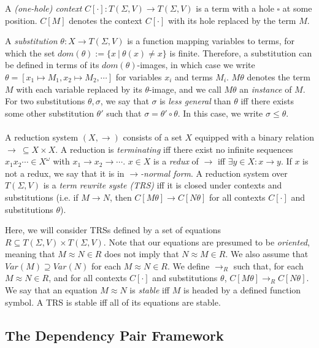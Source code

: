 \documentclass{article}
\begin{document}
A \emph{(one-hole) context} $C[\cdot] : T(\Sigma, V) \rightarrow T(\Sigma, V)$ is a term with a hole $\square$ at some position. $C[M]$ denotes the context $C[\cdot]$ with its hole replaced by the term $M$. 

A \emph{substitution} $\theta : X \rightarrow T(\Sigma, V)$ is a function mapping variables to terms, for which the set $dom(\theta) := \{ x ~|~ \theta(x) \neq x\}$ is finite. Therefore, a substitution can be defined in terms of its $dom(\theta)$-images, in which case we write $\theta = [x_1 \mapsto M_1, x_2 \mapsto M_2, \cdots]$ for variables $x_i$ and terms $M_i$. $M \theta$ denotes the term $M$ with each variable replaced by its $\theta$-image, and we call $M\theta$ an \emph{instance} of $M$. For two substitutions $\theta, \sigma$, we say that $\sigma$ is \emph{less general} than $\theta$ iff there exists some other substitution $\theta'$ such that $\sigma = \theta' \circ \theta$. In this case, we write $\sigma \leq \theta$. 
\\~\\
A reduction system $(X, \rightarrow)$ consists of a set $X$ equipped with a binary relation $\rightarrow ~\subseteq X \times X$. A reduction is \emph{terminating} iff there exist no infinite sequences $x_1x_2 \cdots \in X^\omega$ with $x_1 \rightarrow x_2 \rightarrow \cdots$. $x \in X$ is a \emph{redux} of $\rightarrow$ iff $\exists y \in X : x \rightarrow y$. If $x$ is not a redux, we say that it is in \emph{$\rightarrow$-normal form}. A reduction system over $T(\Sigma, V)$ is a \emph{term rewrite syste (TRS)} iff it is closed under contexts and substitutions (i.e. if $M \rightarrow N$, then $C[M\theta] \rightarrow C[N\theta]$ for all contexts $C[\cdot]$ and substitutions $\theta$). 

Here, we will consider TRSs defined by a set of equations $R \subseteq T(\Sigma, V) \times T(\Sigma, V)$. Note that our equations are presumed to be \emph{oriented}, meaning that $M \approx N \in R$ does not imply that $N \approx M \in R$. We also assume that $Var(M) \supseteq Var(N)$ for each $M \approx N \in R$. We define $\rightarrow_R$ such that, for each $M \approx N \in R$, and for all contexts $C[\cdot]$ and substitutions $\theta$, $C[M\theta] \rightarrow_R C[N\theta]$. We say that an equation $M \approx N$ is \emph{stable} iff $M$ is headed by a defined function symbol. A TRS is stable iff all of its equations are stable.  


\subsection{The Dependency Pair Framework}
\end{document}
